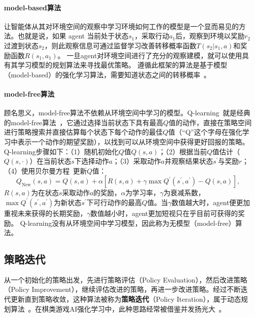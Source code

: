 \paragraph{model-based算法}
让智能体从其对环境空间的观察中学习环境如何工作的模型是一个显而易见的方法。也就是说，如果 agent 当前处于状态$s_{1}$，采取行动$a_{1}$后，观察到环境以奖励$r_{2}$过渡到状态$s_{2}$，则此观察信息可通过监督学习改善转移概率函数$T(s_{2}|s_{1},a)$和奖励函数$R(s_{1},a_{1})$。
一旦agent对环境空间进行了充分的观察建模，就可以使用具有其学习模型的规划算法来寻找最优策略。 遵循此框架的算法是基于模型（model-based）的强化学习算法，需要知道状态之间的转移概率~\cite{moerland2021modelbased,606886,10.1162/089976602753712972}。
\paragraph{model-free算法}
顾名思义，model-free算法不依赖从环境空间中学习的模型。Q-learning~\cite{vanHasselt2012}就是经典的model-free算法~\cite{Sutton1998,tdgam,TechnicalNote}，它通过选择当前状态下具有最高$Q$值的动作，直接在策略空间进行策略搜索并直接估算每个状态下每个动作的最佳$Q$值（“Q”这个字母在强化学习中表示一个动作的期望奖励），以找到可以从环境空间中获得更好回报的策略。
Q-learning步骤如下：（1）随机初始化$Q$值$Q(s,a)$；（2）根据当前$Q$值估计（$Q(s,\cdot)$）在当前状态$s$下选择动作$a$；（3）采取动作$a$并观察结果状态$s^{\prime}$与奖励$r$；（4）使用贝尔曼方程~\cite{dixit1990optimization}更新$Q$值：
\begin{equation*}
  Q_{\text{New}}(s,a) = Q(s,a) + \alpha[R(s,a) + \gamma \max Q^{\prime}(s^{\prime},a^{\prime}) - Q(s,a)],
\end{equation*}
$R(s,a)$为在状态$s$采取动作$a$的奖励，$\alpha$为学习率，$\gamma$为衰减系数，$\max Q^{\prime}(s^{\prime},a^{\prime})$为新状态$s^{\prime}$下可行动作的最高$Q$值。当$\gamma$数值越大时，agent便更加重视未来获得的长期奖励，$\gamma$数值越小时，agent更加短视只在乎目前可获得的奖励。
Q-learning没有从环境空间中学习模型，因此称为无模型（model-free）算法。

\subsection{策略迭代}
从一个初始化的策略出发，先进行策略评估（Policy Evaluation），然后改进策略（Policy Improvement），继续评估改进的策略，再进一步改进策略。经过不断迭代更新直到策略收敛，这种算法被称为\textbf{策略迭代}（Policy Iteration），属于动态规划算法~\cite{Sutton1998}。在棋类游戏AI强化学习中，此种思路经常被借鉴并发扬光大~\cite{Silver1140,Silver2017,Silver2016}。
